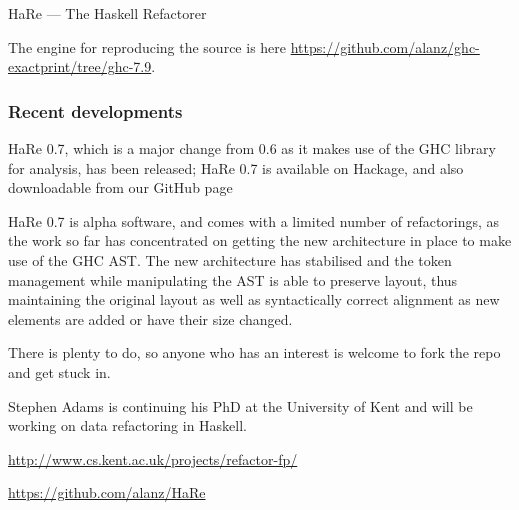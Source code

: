 \begin{hcarentry}[updated]{HaRe --- The Haskell Refactorer}
\begin{compactitem}
\end{compactitem}

The engine for reproducing the source is here \url{https://github.com/alanz/ghc-exactprint/tree/ghc-7.9}.

\subsubsection*{Recent developments}
\begin{compactitem}

\item HaRe 0.7, which is a major change from 0.6 as it makes use of
  the GHC library for analysis, has been released; HaRe 0.7 is
  available on Hackage, and also downloadable from our GitHub page

\item HaRe 0.7 is alpha software, and comes with a limited number of
  refactorings, as the work so far has concentrated on getting the new
  architecture in place to make use of the GHC AST. The new
  architecture has stabilised and the token management while
  manipulating the AST is able to preserve layout, thus maintaining
  the original layout as well as syntactically correct alignment as
  new elements are added or have their size changed.

\item There is plenty to do, so anyone who has an interest is welcome
  to fork the repo and get stuck in.
\item Stephen Adams is continuing his PhD at the University of Kent and
  will be working on data refactoring in Haskell.
\end{compactitem}

\FurtherReading
\begin{compactitem}
\item \url{http://www.cs.kent.ac.uk/projects/refactor-fp/}
\item \url{https://github.com/alanz/HaRe}
\end{compactitem}
\end{hcarentry}
